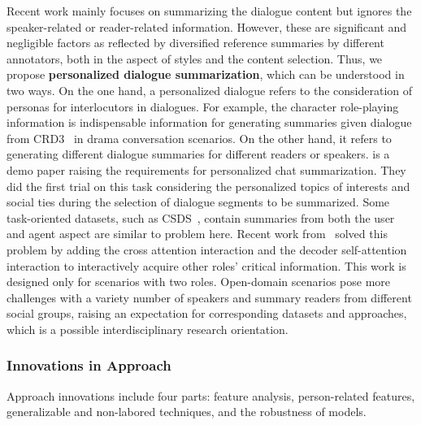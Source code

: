 



Recent work mainly focuses on summarizing the dialogue content but ignores the speaker-related or reader-related information. 
However, these are significant and negligible factors as reflected by diversified reference summaries by different annotators, both in the aspect of styles and the content selection.
Thus, we propose \textbf{personalized dialogue summarization}, which can be understood in two ways. 
On the one hand, a personalized dialogue refers to the consideration of 
personas for interlocutors in dialogues. For example, the character 
role-playing information is indispensable information for generating 
summaries given dialogue from CRD3~\cite{rameshkumar2020storytelling} in drama conversation scenarios.
On the other hand, it refers to generating different dialogue summaries for 
different readers or speakers. \citet{tepper2018personal} is a demo paper raising the 
requirements for personalized chat summarization. They did the first trial 
on this task considering the personalized topics of interests and social ties 
during the selection of dialogue segments to be summarized. 
Some task-oriented datasets, such as CSDS~\cite{lin2021csds}, contain summaries from both the user and agent aspect are similar
to problem here. Recent work from~\citet{lin2022other} solved this problem by adding the cross attention interaction and the decoder self-attention interaction to interactively acquire other roles' critical information. This work is designed only for scenarios with two roles.
Open-domain scenarios pose more challenges with a variety number of speakers and summary readers from different social groups, raising an
expectation for corresponding datasets and approaches, which is a possible interdisciplinary research orientation.


\subsubsection{Innovations in Approach} 
Approach innovations include four parts:  feature analysis, person-related features, generalizable and non-labored techniques, and the robustness of models.

